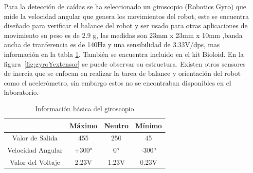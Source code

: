Para la detecci\'on de ca\'idas se ha seleccionado un giroscopio (Robotics Gyro) que mide la velocidad angular que genera los movimientos del robot, este se encuentra diseñado para verificar el balance del robot y ser usado para otras aplicaciones de movimiento \cite{gyro}  su peso es de 2.9 g, las medidas son 23mm x 23mm x 10mm ,banda ancha de tranferencia es de 140Hz y una sensibilidad de 3.33V/dps, mas informaci\'on en la tabla \ref{copio}. También se encuentra incluido en el kit Bioloid. En la figura~\ref{fig:gyroYextensor} se puede observar su estructura. Existen otros sensores de inercia que se enfocan en realizar la tarea de balance y orientaci\'on del robot como el aceler\'ometro, sin embargo estos no se encontraban disponibles en el laboratorio.



\begin{table}
\centering
\begin{tabular}{|c | c c c|}
\hline 
 & M\'aximo & Neutro & M\'inimo \\ 
\hline
Valor de Salida & 455 & 250 & 45 \\ 

Velocidad Angular & +300$^o$ & 0$^o$ & -300$^o$ \\ 
 
Valor del Voltaje & 2.23V & 1.23V & 0.23V \\ 
\hline 
\end{tabular} 
\caption{Informaci\'on b\'asica del giroscopio}
\label{copio}

\end{table}


